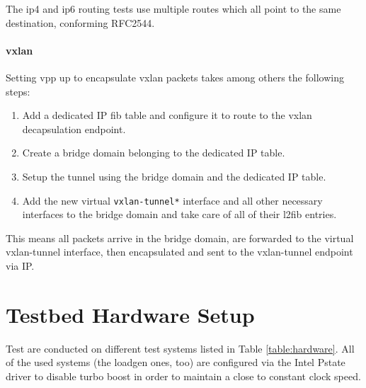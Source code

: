 The \Ac{ip4} and \Ac{ip6} routing tests use multiple routes which all
point to the same destination, conforming RFC2544.

\paragraph{\Ac{vxlan}}

Setting \Ac{vpp} up to encapsulate \Ac{vxlan} packets takes among
others the following steps:

\begin{enumerate}
	\item Add a dedicated IP \Ac{fib} table and configure it to route to the \Ac{vxlan} decapsulation endpoint.
	\item Create a bridge domain belonging to the dedicated IP table.
	\item Setup the tunnel using the bridge domain and the dedicated IP table.
	\item Add the new virtual \lstinline|vxlan-tunnel*| interface and all other necessary interfaces to the bridge domain and take care of all of their l2fib entries. 
\end{enumerate}

This means all packets arrive in the bridge domain, are forwarded to
the virtual vxlan-tunnel interface, then encapsulated and sent to the
vxlan-tunnel endpoint via IP.

\newpage
\section{Testbed Hardware Setup}
\label{sec:hardware}

Test are conducted on different test systems listed in Table
\ref{table:hardware}. All of the used systems (the \Ac{loadgen} ones,
too) are configured via the Intel Pstate driver to disable turbo boost
in order to maintain a close to constant clock speed.


